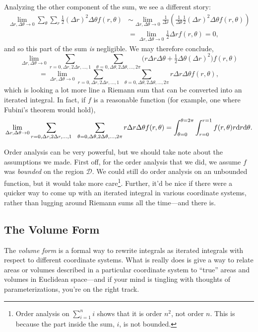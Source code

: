 Analyzing the other component of the sum, we see a different story:
\begin{align*}
	\lim_{\Delta r,\Delta\theta\to 0}
	\sum_{\theta}\sum_{r} \tfrac{1}{2}(\Delta r)^2\Delta \theta f(r,\theta)
	&\sim
	\lim_{\Delta r,\Delta\theta\to 0}
	\frac{1}{\Delta r}\left(\frac{1}{\Delta \theta} \tfrac{1}{2}(\Delta r)^2\Delta\theta f(r,\theta)\right)\\
	&=\lim_{\Delta r,\Delta\theta \to 0}\tfrac{1}{2}\Delta rf(r,\theta) = 0,
\end{align*}
and so this part of the sum \emph{is} negligible.  We may therefore conclude,
\[
	\lim_{\Delta r,\Delta \theta\to 0}
	\sum_{r=0,\Delta r,2\Delta r,\ldots,1}\ \ \sum_{\theta=0,\Delta\theta,
	2\Delta\theta, \ldots, 2\pi} \Big(
		r\Delta r\Delta \theta + \tfrac{1}{2}\Delta\theta(\Delta r)^2
	\Big)f(r,\theta)
\]
\[
	=\lim_{\Delta r,\Delta \theta\to 0}
	\sum_{r=0,\Delta r,2\Delta r,\ldots,1}\ \ \sum_{\theta=0,\Delta\theta,
	2\Delta\theta, \ldots, 2\pi} 
		r\Delta r\Delta \theta f(r,\theta),
\]
which is looking a lot more line a Riemann sum that can be converted into an iterated integral.
In fact, if $f$ is a reasonable function (for example, one where Fubini's theorem would hold),
\[
	\lim_{\Delta r,\Delta \theta\to 0}
	\sum_{r=0,\Delta r,2\Delta r,\ldots,1}\ \ \sum_{\theta=0,\Delta\theta,
	2\Delta\theta, \ldots, 2\pi} 
		r\Delta r\Delta \theta f(r,\theta)
		=\int_{\theta=0}^{\theta=2\pi}\int_{r=0}^{r=1}f(r,\theta)r\d r\d \theta.
\]

Order analysis can be very powerful, but we should take note about the assumptions we made.
First off, for the order analysis that we did, we assume $f$ was \emph{bounded} on the region
$\mathcal D$.  We could still do order analysis on an unbounded function, but it would take more 
care\footnote{
	Order analysis on $\sum_{i=1}^n i$ shows that it is order $n^2$, not order $n$.
	This is because the part inside the sum, $i$, is not bounded.
}.  Further, it'd be nice if there were a quicker way to come up with an iterated
integral in various coordinate systems, rather than lugging around Riemann sums
all the time---and there is.

\subsection{The Volume Form}

The \emph{volume form} is a formal way to rewrite integrals as iterated integrals
with respect to different coordinate systems.  What is really does is give a way
to relate areas or volumes described in a particular coordinate system to ``true''
areas and volumes in Euclidean space---and if your mind is tingling with thoughts
of parameterizations, you're on the right track.


